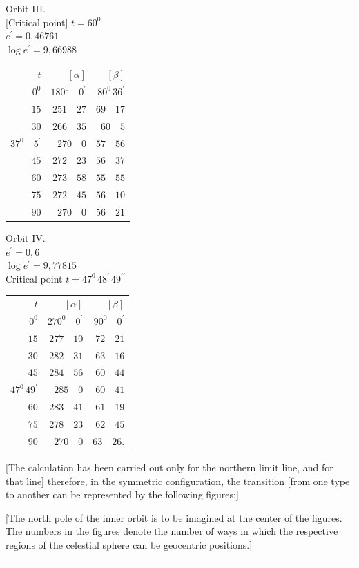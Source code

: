 \begin{center}
Orbit III.\\[3pt]
[Critical point] \(t=60^{0}\)\\
\(e^{\prime}=0{,}46761\)\\
\(\log e^{\prime}=9{,}66988\)\par\smallskip
\begin{tabular}{r@{\qquad}r@{\qquad}r}
\(t\)&\([\alpha]\)&\([\beta]\)\\[3pt]
\(0^{0}\)&\(180^{0}\quad0^{\prime}\)&\(80^{0}\,36^{\prime}\)\\
\(15\)&\(251\quad27\)&\(69\quad17\)\\
\(30\)&\(266\quad35\)&\(60\quad5\)\\
\(37^{0}\quad5^{\prime}\)&\(270\quad0\)&\(57\quad56\)\\
\(45\)&\(272\quad23\)&\(56\quad37\)\\
\(60\)&\(273\quad58\)&\(55\quad55\)\\
\(75\)&\(272\quad45\)&\(56\quad10\)\\
\(90\)&\(270\quad0\)&\(56\quad21\)
\end{tabular}
\end{center}
\begin{center}
Orbit IV.\\[3pt]
\(e^{\prime}=0{,}6\)\\
\(\log e^{\prime}=9{,}77815\)\\
Critical point \(t=47^{0}\,48^{\prime}\,49^{\prime\prime}\)\par\smallskip
\begin{tabular}{r@{\qquad}r@{\qquad}r}
\(t\)&\([\alpha]\)&\([\beta]\)\\[3pt]
\(0^{0}\)&\(270^{0}\quad0^{\prime}\)&\(90^{0}\quad0^{\prime}\)\\
\(15\)&\(277\quad10\)&\(72\quad21\)\\
\(30\)&\(282\quad31\)&\(63\quad16\)\\
\(45\)&\(284\quad56\)&\(60\quad44\)\\
\(47^{0}\,49^{\prime}\)&\(285\quad0\)&\(60\quad41\)\\
\(60\)&\(283\quad41\)&\(61\quad19\)\\
\(75\)&\(278\quad23\)&\(62\quad45\)\\
\(90\)&\(270\quad0\)&\(63\quad26.\)
\end{tabular}
\end{center}

[The calculation has been carried out only for the northern limit line, and for that line] therefore, in the symmetric configuration, the transition [from one type to another can be represented by the following figures:]

[The north pole of the inner orbit is to be imagined at the center of the figures. The numbers in the figures denote the number of ways in which the respective regions of the celestial sphere can be geocentric positions.]
\begin{center}\rule{.22\textwidth}{.3pt}\end{center}
